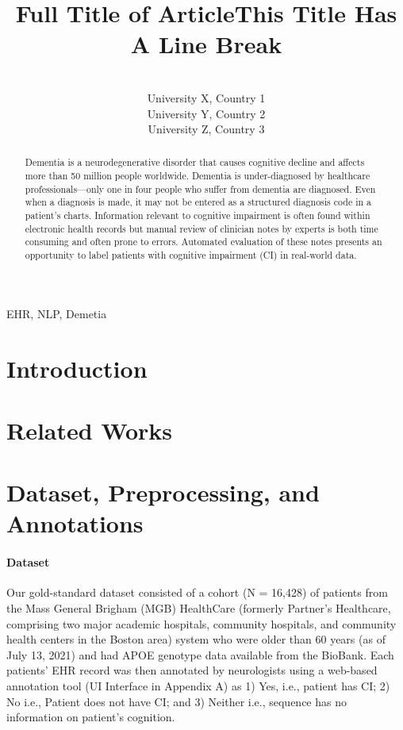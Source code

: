 \documentclass[pmlr,twocolumn,10pt]{jmlr} %
\title[Short Title]{Full Title of Article\titlebreak This Title Has
A Line Break}
\author{%
\Name{First Author 1}\equal{These authors contributed equally} \Email{abc@sample.com}\\
\addr University X, Country 1
\AND
\Name{First Author 2}\footnotemark[1] \Email{def@sample.com}\\
\addr University Y, Country 2
\AND
\Name{Last Author} \Email{ghi@sample.com}\\
\addr University Z, Country 3
}
\begin{document}
\maketitle

\begin{abstract}
\tab Dementia is a neurodegenerative disorder that causes cognitive decline and affects more than 50 million people worldwide. Dementia is under-diagnosed by healthcare professionals—only one in four people who suffer from dementia are diagnosed. Even when a diagnosis is made, it may not be entered as a structured diagnosis code in a patient’s charts.  Information relevant to cognitive impairment is often found within electronic health records but manual review of clinician notes by experts is both time consuming and often prone to errors. Automated evaluation of these notes presents an opportunity to label patients with cognitive impairment (CI) in real-world data. 
\end{abstract}

\begin{keywords}
EHR, NLP, Demetia
\end{keywords}

\section{Introduction}
\label{sec:intro}

\section{Related Works}
\label{sec:RelatedWorks}

\section{Dataset, Preprocessing, and Annotations}

\paragraph{Dataset}
\label{sec:Dataset} Our gold-standard dataset consisted of a cohort (N = 16,428) of patients from the Mass General Brigham (MGB) HealthCare (formerly Partner's Healthcare, comprising two major academic hospitals, community hospitals, and community health centers in the Boston area) system who were older than 60 years (as of July 13, 2021) and had APOE genotype data available from the BioBank. Each patients' EHR record was then annotated by neurologists using a web-based annotation tool (UI Interface in Appendix A) as 1) Yes, i.e., patient has CI; 2) No i.e., Patient does not have CI; and 3) Neither i.e., sequence has no information on patient’s cognition.
\end{document}
